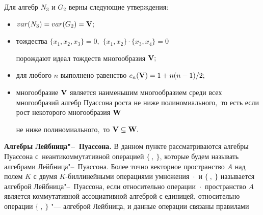 \smallskip



\begin{theorem}

Для алгебр $N_3$ и $G_2$ верны следующие утверждения\/$:$



\begin{itemize}



\item[\rm (i)] $\mathop{var}(N_3) = \mathop{var}(G_2) = {\bf V};$



\item[\rm (ii)] тождества $\{x_1,x_2,x_3\}=0,$ $\{x_1,x_2\}\cdot \{x_3,x_4\}=0$

порождают идеал тождеств многообразия ${\bf V};$



\item[\rm (iii)] для любого $n$ выполнено равенство $c_n({\bf V}) = 1+{n(n-1)}/{2};$



\item[\rm (iv)] многообразие ${\bf V}$ является наименьшим многообразием среди всех многообразий алгебр Пуассона роста не ниже полиномиального$,$ то есть если рост некоторого многообразия ${\bf W}$

не ниже полиномиального$,$ то ${\bf V} \subseteq {\bf W}.$



\end{itemize}



\end{theorem}



\smallskip



{\bf Алгебры Лейбница"--~Пуассона.} В данном пункте рассматриваются алгебры Пуассона с~неантикоммутативной операцией $\{~,~\}$, которые будем называть алгебрами Лейбница"--~Пуассона. Более точно векторное пространство $A$ над полем $K$ с двумя $K$-биллинейными операциями умножения ${}\cdot{}$ и $\{~,~\}$ называется алгеброй Лейбница"--~Пуассона, если относительно операции ${}\cdot{}$ пространство $A$ является коммутативной ассоциативной алгеброй с единицей, относительно операции $\{~,~\}$ "--- алгеброй Лейбница, и данные операции связаны правилами

$$

